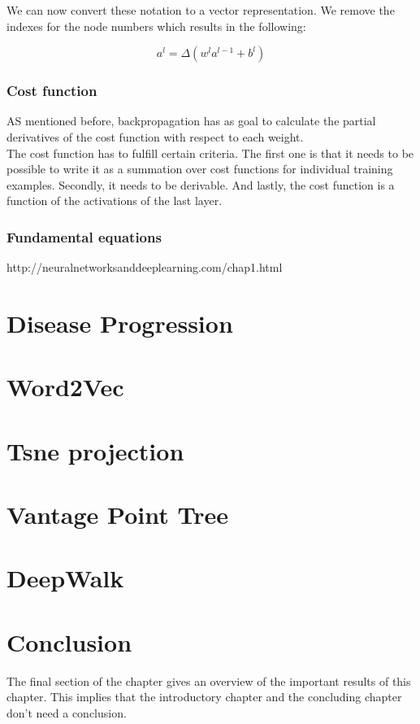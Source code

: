 We can now convert these notation to a vector representation. We remove the indexes for the node numbers which results in the following:

\begin{equation} 
a^l = \Delta (w^la^{l-1}+b^l)
\end{equation}

		\subsubsection{Cost function}
		
AS mentioned before, backpropagation has as goal to calculate the partial derivatives of the cost function with respect to each weight. \\
The cost function has to fulfill certain criteria. The first one is that it needs to be possible to write it as a summation over cost functions for individual training examples. Secondly, it needs to be derivable. And lastly, the cost function is a function of the activations of the last layer. 


		\subsubsection{Fundamental equations}





http://neuralnetworksanddeeplearning.com/chap1.html


\section{Disease Progression}

\section{Word2Vec}
\lipsum[64]

\section{Tsne projection}

\section{Vantage Point Tree}

\section{DeepWalk}
\lipsum[64]

\section{Conclusion}
The final section of the chapter gives an overview of the important results
of this chapter. This implies that the introductory chapter and the
concluding chapter don't need a conclusion.

\lipsum[66]

